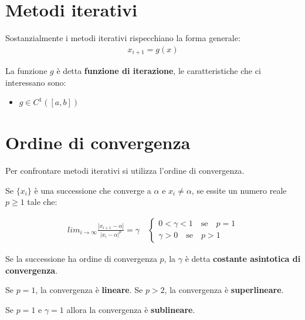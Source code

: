 \section{Metodi iterativi}
Sostanzialmente i metodi iterativi rispecchiano la forma generale:
\begin{align}
  x_{i+1} = g(x)
\end{align}

La funzione $g$ \`e detta \textbf{funzione di iterazione}, le caratteristiche che ci interessano sono:
\begin{itemize}
  \item $g \in C^1([a, b])$
\end{itemize}


\section{Ordine di convergenza}
Per confrontare metodi iterativi si utilizza l'ordine di convergenza.

Se $\{x_i\}$ \`e una successione che converge a $\alpha$ e $x_i \neq \alpha$, se essite un numero
reale $p \geq 1$ tale che:

\begin{align}
  lim_{i \rightarrow \infty} \frac{|x_{i+1} - \alpha|}{|x_i - \alpha|^p} = \gamma \quad \begin{cases}
    0 < \gamma < 1 \quad \text{se} \quad p = 1 \\
    \gamma > 0 \quad \text{se} \quad p > 1
  \end{cases}
\end{align}



Se la successione ha ordine di convergenza $p$, la $\gamma$ \`e detta \textbf{costante asintotica di convergenza}.

Se $p = 1$, la convergenza \`e \textbf{lineare}.
Se $p > 2$, la convergenza \`e \textbf{superlineare}.


Se $p = 1$ e $\gamma = 1$ allora la convergenza \`e \textbf{sublineare}.



%
%
%
